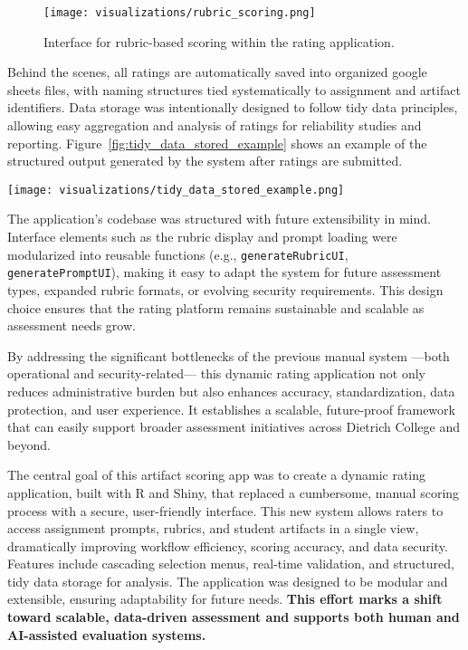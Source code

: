 \documentclass[12pt]{article}%
\begin{document}
\begin{figure}[h]
    \centering
    \texttt{[image: visualizations/rubric\_scoring.png]}
    \caption{Interface for rubric-based scoring within the rating application.}
    \label{fig:rubric_scoring}
\end{figure}

Behind the scenes, all ratings are automatically saved into organized google sheets files, with naming structures tied systematically to assignment and artifact identifiers. Data storage was intentionally designed to follow tidy data principles, allowing easy aggregation and analysis of ratings for reliability studies and reporting. Figure~\ref{fig:tidy_data_stored_example} shows an example of the structured output generated by the system after ratings are submitted.

\begin{figure*}[h]
    \centering
    \texttt{[image: visualizations/tidy\_data\_stored\_example.png]}
    \caption{Example of structured, tidy data storage from rating submissions.}
    \label{fig:tidy_data_stored_example}
\end{figure*}

The application's codebase was structured with future extensibility in mind. Interface elements such as the rubric display and prompt loading were modularized into reusable functions (e.g., \texttt{generateRubricUI}, \texttt{generatePromptUI}), making it easy to adapt the system for future assessment types, expanded rubric formats, or evolving security requirements. This design choice ensures that the rating platform remains sustainable and scalable as assessment needs grow.

By addressing the significant bottlenecks of the previous manual system —both operational and security-related— this dynamic rating application not only reduces administrative burden but also enhances accuracy, standardization, data protection, and user experience. It establishes a scalable, future-proof framework that can easily support broader assessment initiatives across Dietrich College and beyond.

The central goal of this artifact scoring app was to create a dynamic rating application, built with R and Shiny, that replaced a cumbersome, manual scoring process with a secure, user-friendly interface. This new system allows raters to access assignment prompts, rubrics, and student artifacts in a single view, dramatically improving workflow efficiency, scoring accuracy, and data security. Features include cascading selection menus, real-time validation, and structured, tidy data storage for analysis. The application was designed to be modular and extensible, ensuring adaptability for future needs. \textbf{This effort marks a shift toward scalable, data-driven assessment and supports both human and AI-assisted evaluation systems.}
\end{document}
